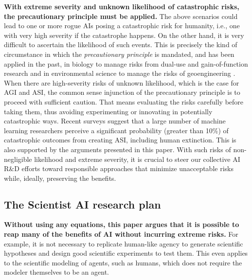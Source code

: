 \textbf{With extreme severity and unknown likelihood of catastrophic risks, the precautionary principle must be applied.}
The above scenarios could lead to one or more rogue AIs posing a catastrophic risk for humanity, i.e., one with very high severity if the catastrophe happens. On the other hand, it is very difficult to ascertain the likelihood of such events. This is precisely the kind of circumstance in which the \textit{precautionary principle} \cite{www.europarl.europa.eu.thinktank.en.document.EPRS.IDA..2015} is mandated, and has been applied in the past, in biology to manage risks from dual-use and gain-of-function research \cite{pubmed.ncbi.nlm.nih.gov.19594724} and in environmental science to manage the risks of geoengineering \cite{royalsociety.org.news.resources.publications.2009.geoengineering.climate}. When there are high-severity risks of unknown likelihood, which is the case for AGI and ASI, the common sense injunction of the precautionary principle is to proceed with sufficient caution. That means evaluating the risks carefully before taking them, thus avoiding experimenting or innovating in potentially catastrophic ways. Recent surveys \cite{arxiv.org.abs.2401.02843} suggest that a large number of machine learning researchers perceive a significant probability (greater than 10\%) of catastrophic outcomes from creating ASI, including human extinction. This is also supported by the arguments presented in this paper. With such risks of non-negligible likelihood and extreme severity, it is crucial to steer our collective AI R\&D efforts toward responsible approaches that minimize unacceptable risks while, ideally, preserving the benefits.

\subsection{The Scientist AI research plan}

\textbf{Without using any equations, this paper argues that it is possible to reap many of the benefits of AI without incurring extreme risks.} For example, it is not necessary to replicate human-like agency to generate scientific hypotheses and design good scientific experiments to test them. This even applies to the scientific modeling of agents, such as humans, which does not require the modeler themselves to be an agent.

